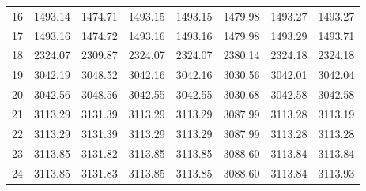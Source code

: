 \documentclass[10pt,oneside]{article}
\begin{document}
\begin{table}[h!]
\begin{tabular}{cccccccc}
16 &   1493.14 & 1474.71 & 1493.15 & 1493.15 &      1479.98 & 1493.27 & 1493.27 \\
17 &   1493.16 & 1474.72 & 1493.16 & 1493.16 &      1479.98 & 1493.29 & 1493.71 \\
18 &   2324.07 & 2309.87 & 2324.07 & 2324.07 &      2380.14 & 2324.18 & 2324.18 \\
19 &   3042.19 & 3048.52 & 3042.16 & 3042.16 &      3030.56 & 3042.01 & 3042.04 \\
20 &   3042.56 & 3048.56 & 3042.55 & 3042.55 &      3030.68 & 3042.58 & 3042.58 \\
21 &   3113.29 & 3131.39 & 3113.29 & 3113.29 &      3087.99 & 3113.28 & 3113.19 \\
22 &   3113.29 & 3131.39 & 3113.29 & 3113.29 &      3087.99 & 3113.28 & 3113.28 \\
23 &   3113.85 & 3131.82 & 3113.85 & 3113.85 &      3088.60 & 3113.84 & 3113.84 \\
24 &   3113.85 & 3131.83 & 3113.85 & 3113.85 &      3088.60 & 3113.84 & 3113.93 \\
\bottomrule
\end{tabular}
\end{table}

\clearpage
\end{document}
